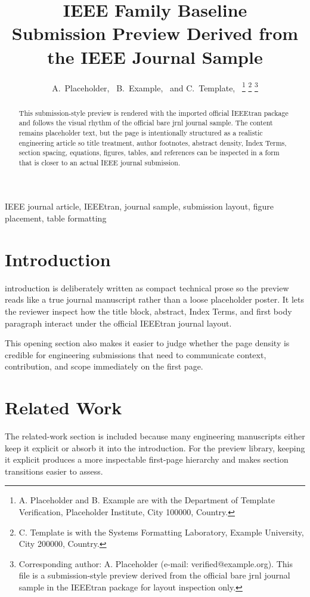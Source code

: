 \documentclass[journal]{IEEEtran}
\title{IEEE Family Baseline\\\large Submission Preview Derived from the IEEE Journal Sample}
\author{A.~Placeholder,~\IEEEmembership{Member,~IEEE,}%
B.~Example,~\IEEEmembership{Senior Member,~IEEE,}%
and C.~Template,~\IEEEmembership{Member,~IEEE}%
\thanks{A. Placeholder and B. Example are with the Department of Template Verification, Placeholder Institute, City 100000, Country.}%
\thanks{C. Template is with the Systems Formatting Laboratory, Example University, City 200000, Country.}%
\thanks{Corresponding author: A. Placeholder (e-mail: verified@example.org). This file is a submission-style preview derived from the official bare jrnl journal sample in the IEEEtran package for layout inspection only.}}
\begin{document}
\maketitle
\begin{abstract}
This submission-style preview is rendered with the imported official IEEEtran package and follows the visual rhythm of the official bare jrnl journal sample. The content remains placeholder text, but the page is intentionally structured as a realistic engineering article so title treatment, author footnotes, abstract density, Index Terms, section spacing, equations, figures, tables, and references can be inspected in a form that is closer to an actual IEEE journal submission.
\end{abstract}
\begin{IEEEkeywords}
IEEE journal article, IEEEtran, journal sample, submission layout, figure placement, table formatting
\end{IEEEkeywords}
\section{Introduction}
 introduction is deliberately written as compact technical prose so the preview reads like a true journal manuscript rather than a loose placeholder poster. It lets the reviewer inspect how the title block, abstract, Index Terms, and first body paragraph interact under the official IEEEtran journal layout.

This opening section also makes it easier to judge whether the page density is credible for engineering submissions that need to communicate context, contribution, and scope immediately on the first page.
\section{Related Work}
The related-work section is included because many engineering manuscripts either keep it explicit or absorb it into the introduction. For the preview library, keeping it explicit produces a more inspectable first-page hierarchy and makes section transitions easier to assess.
\end{document}

